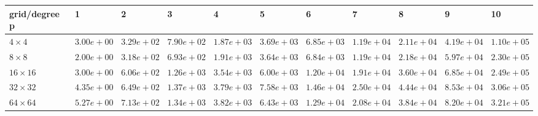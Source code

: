\begin{tabular}{lllllllllll}
\hline
 grid/degree p   & 1          & 2          & 3          & 4          & 5          & 6          & 7          & 8          & 9          & 10         \\
\hline
 $4 \times 4$    & $3.00e+00$ & $3.29e+02$ & $7.90e+02$ & $1.87e+03$ & $3.69e+03$ & $6.85e+03$ & $1.19e+04$ & $2.11e+04$ & $4.19e+04$ & $1.10e+05$ \\
 $8 \times 8$    & $2.00e+00$ & $3.18e+02$ & $6.93e+02$ & $1.91e+03$ & $3.64e+03$ & $6.84e+03$ & $1.19e+04$ & $2.18e+04$ & $5.97e+04$ & $2.30e+05$ \\
 $16 \times 16$  & $3.00e+00$ & $6.06e+02$ & $1.26e+03$ & $3.54e+03$ & $6.00e+03$ & $1.20e+04$ & $1.91e+04$ & $3.60e+04$ & $6.85e+04$ & $2.49e+05$ \\
 $32 \times 32$  & $4.35e+00$ & $6.49e+02$ & $1.37e+03$ & $3.79e+03$ & $7.58e+03$ & $1.46e+04$ & $2.50e+04$ & $4.44e+04$ & $8.53e+04$ & $3.06e+05$ \\
 $64 \times 64$  & $5.27e+00$ & $7.13e+02$ & $1.34e+03$ & $3.82e+03$ & $6.43e+03$ & $1.29e+04$ & $2.08e+04$ & $3.84e+04$ & $8.20e+04$ & $3.21e+05$ \\
\hline
\end{tabular}